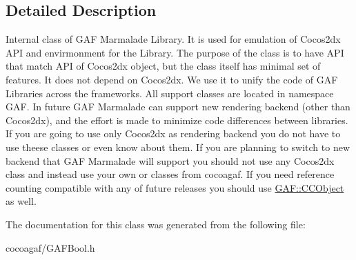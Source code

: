 \subsection{Detailed Description}
Internal class of G\-A\-F Marmalade Library. It is used for emulation of Cocos2dx A\-P\-I and envirmonment for the Library. The purpose of the class is to have A\-P\-I that match A\-P\-I of Cocos2dx object, but the class itself has minimal set of features. It does not depend on Cocos2dx. We use it to unify the code of G\-A\-F Libraries across the frameworks. All support classes are located in namespace G\-A\-F. In future G\-A\-F Marmalade can support new rendering backend (other than Cocos2dx), and the effort is made to minimize code differences between libraries. If you are going to use only Cocos2dx as rendering backend you do not have to use theese classes or even know about them. If you are planning to switch to new backend that G\-A\-F Marmalade will support you should not use any Cocos2dx class and instead use your own or classes from cocoagaf. If you need reference counting compatible with any of future releases you should use \hyperlink{class_g_a_f_1_1_c_c_object}{G\-A\-F\-::\-C\-C\-Object} as well. 

The documentation for this class was generated from the following file\-:\begin{DoxyCompactItemize}
\item 
cocoagaf/G\-A\-F\-Bool.\-h\end{DoxyCompactItemize}
